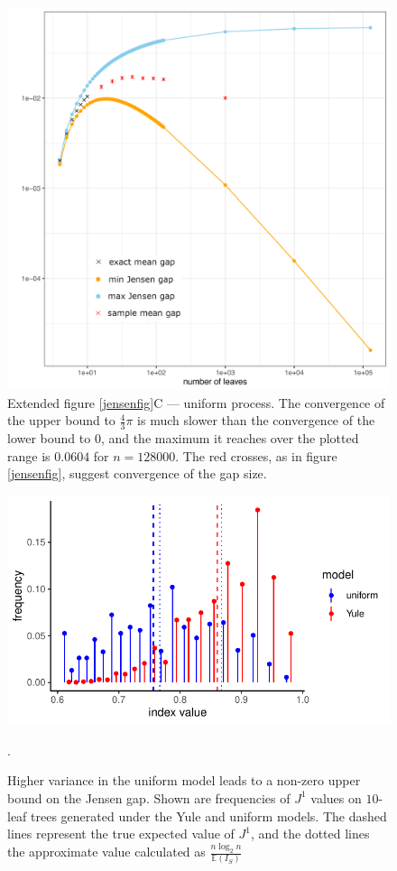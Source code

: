 \begin{figure}[h]
    \centering
    \includegraphics[width=\textwidth]{Chapter_2/figures/jensen_gap_1k.pdf}
    \caption{Extended figure \ref{jensenfig}C --- uniform process. The
    convergence of the upper bound to $\frac{4}{3}\pi$ is much slower than the
    convergence of the lower bound to $0$, and the maximum it reaches over the
    plotted range is $0.0604$ for $n=128000$. The red crosses, as in figure
    \ref{jensenfig}, suggest convergence of the gap size.}
    \label{conv_upper_fig}
\end{figure}
\begin{figure}[h]
    \centering
    \includegraphics{Chapter_2/figures/var_fig.pdf}
    \caption{Higher variance in the uniform model leads to a non-zero upper
    bound on the Jensen gap. Shown are frequencies of $J^1$ values on $10$-leaf
    trees generated under the Yule and uniform models. The dashed lines
    represent the true expected value of $J^1$, and the dotted lines the
    approximate value calculated as $\frac{n\log_2n}{\mathbb{E}(I_S)}$}.
    \label{var_fig}
\end{figure}
\clearpage

